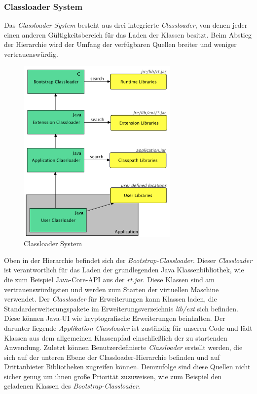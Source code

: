 \subsubsection{Classloader System}
Das \textit{Classloader System} besteht aus drei integrierte \textit{Classloader}, von denen jeder einen anderen Gültigkeitsbereich für das Laden der Klassen besitzt. Beim Abstieg der Hierarchie wird der Umfang der verfügbaren Quellen breiter und weniger vertrauenswürdig. 
\begin{figure}[h!]
  \centering
  \includegraphics[width=0.7\textwidth]{material/images/Classloader.png}
  \caption{Classloader System}
  \label{fig:Classloader}
\end{figure}
\newline
Oben in der Hierarchie befindet sich der \textit{Bootstrap-Classloader}. Dieser \textit{Classloader} ist verantwortlich für das Laden der grundlegenden Java Klassenbibliothek, wie die zum Beispiel Java-Core-API aus der \textit{rt.jar}. Diese Klassen sind am vertrauenswürdigsten und werden zum Starten der virtuellen Maschine verwendet. Der \textit{Classloader} für Erweiterungen kann Klassen laden, die Standarderweiterungspakete im Erweiterungsverzeichnis \textit{lib/ext} sich befinden. Diese können Java-UI wie kryptografische Erweiterungen beinhalten. Der darunter liegende \textit{Applikation Classloader} ist zuständig für unseren Code und lädt Klassen aus dem allgemeinen Klassenpfad einschließlich der zu startenden Anwendung. Zuletzt können Benutzerdefinierte \textit{Classloader} erstellt werden, die sich auf der unteren Ebene der Classloader-Hierarchie befinden und auf Drittanbieter Bibliotheken zugreifen können. Demzufolge sind diese Quellen nicht sicher genug um ihnen große Priorität zuzuweisen, wie zum Beispiel den geladenen Klassen des \textit{Bootstrap-Classloader}. 
